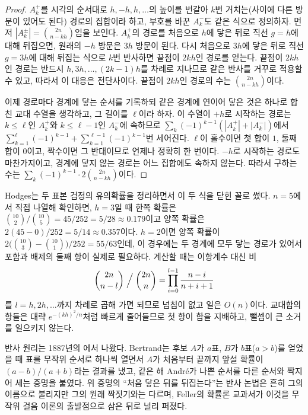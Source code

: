 \begin{proof}
$A_k^+$를 시각의 순서대로 $h,-h,h,\dots$의 높이를 번갈아 $k$번 거치는(사이에 다른 방문이 있어도 된다) 경로의 집합이라 하고, 부호를 바꾼 $A_k^-$도 같은 식으로 정의하자. 먼저 $|A_k^\pm|=\binom{2n}{n-kh}$임을 보인다. $A_k^+$의 경로를 처음으로 $h$에 닿은 뒤로 직선 $g=h$에 대해 뒤집으면, 원래의 $-h$ 방문은 $3h$ 방문이 된다. 다시 처음으로 $3h$에 닿은 뒤로 직선 $g=3h$에 대해 뒤집는 식으로 $k$번 반사하면 끝점이 $2kh$인 경로를 얻는다. 끝점이 $2kh$인 경로는 반드시 $h,3h,\dots,(2k-1)h$를 차례로 지나므로 같은 반사를 거꾸로 적용할 수 있고, 따라서 이 대응은 전단사이다. 끝점이 $2kh$인 경로의 수는 $\binom{2n}{n-kh}$이다.

이제 경로마다 경계에 닿는 순서를 기록하되 같은 경계에 연이어 닿은 것은 하나로 합친 교대 수열을 생각하고, 그 길이를 $\ell$이라 하자. 이 수열이 $+h$로 시작하는 경로는 $k\le\ell$인 $A_k^+$와 $k\le\ell-1$인 $A_k^-$에 속하므로 $\sum_k(-1)^{k-1}(|A_k^+|+|A_k^-|)$에서 $\sum_{k=1}^\ell(-1)^{k-1}+\sum_{k=1}^{\ell-1}(-1)^{k-1}$번 세어진다. $\ell$이 홀수이면 첫 합이 $1$, 둘째 합이 $0$이고, 짝수이면 그 반대이므로 언제나 정확히 한 번이다. $-h$로 시작하는 경로도 마찬가지이고, 경계에 닿지 않는 경로는 어느 집합에도 속하지 않는다. 따라서 구하는 수는 $\sum_k(-1)^{k-1}\cdot2\binom{2n}{n-kh}$이다.
\end{proof}

Hodges는 두 표본 검정의 유의확률을 정리하면서 이 두 식을 닫힌 꼴로 썼다\cite{hodges1958}. $n=5$에서 직접 나열해 확인하면, $h=3$일 때 한쪽 확률은 $\binom{10}2/\binom{10}5=45/252=5/28\approx0.179$이고 양쪽 확률은 $2(45-0)/252=5/14\approx0.357$이다. $h=2$이면 양쪽 확률이 $2\bigl(\binom{10}3-\binom{10}1\bigr)/252=55/63$인데, 이 경우에는 두 경계에 모두 닿는 경로가 있어서 포함과 배제의 둘째 항이 실제로 필요하다. 계산할 때는 이항계수 대신 비
\[
\binom{2n}{n-l}\Bigm/\binom{2n}n=\prod_{i=0}^{l-1}\frac{n-i}{n+i+1}
\]
를 $l=h,2h,\dots$까지 차례로 곱해 가면 되므로 넘침이 없고 일은 $O(n)$이다. 교대합의 항들은 대략 $e^{-(kh)^2/n}$처럼 빠르게 줄어들므로 첫 항이 합을 지배하고, 뺄셈이 큰 소거를 일으키지 않는다.

\begin{aside}[투표 문제]
반사 원리는 1887년의 에서 나왔다. Bertrand는 후보 $A$가 $a$표, $B$가 $b$표($a>b$)를 얻었을 때 표를 무작위 순서로 하나씩 열면서 $A$가 처음부터 끝까지 앞설 확률이 $(a-b)/(a+b)$라는 결과를 냈고, 같은 해 André가 나쁜 순서를 다른 순서와 짝지어 세는 증명을 붙였다. 위 증명의 ``처음 닿은 뒤를 뒤집는다''는 반사 논법은 흔히 그의 이름으로 불리지만 그의 원래 짝짓기와는 다르며, Feller의 확률론 교과서가 이것을 무작위 걸음 이론의 출발점으로 삼은 뒤로 널리 퍼졌다\cite{feller1968}.
\end{aside}

